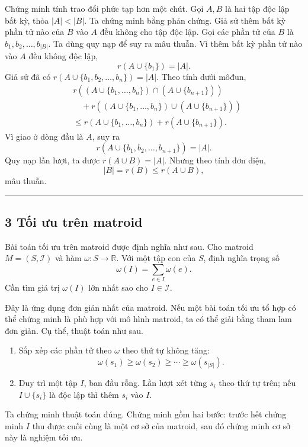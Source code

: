 \documentclass[11pt]{article}
\newcommand{\qedmark}{\hfill\rule{0.7ex}{0.7ex}}
\begin{document}
Chứng minh tính trao đổi phức tạp hơn một chút. Gọi \(A,B\) là hai tập độc lập
bất kỳ, thỏa \(|A|<|B|\). Ta chứng minh bằng phản chứng. Giả sử thêm bất kỳ
phần tử nào của \(B\) vào \(A\) đều không cho tập độc lập. Gọi các phần tử của
\(B\) là \(b_1,b_2,\ldots,b_{|B|}\). Ta dùng quy nạp để suy ra mâu thuẫn. Vì
thêm bất kỳ phần tử nào vào \(A\) đều không độc lập,
\[
  r(A\cup\{b_1\})=|A|.
\]
Giả sử đã có \(r(A\cup\{b_1,b_2,\ldots,b_n\})=|A|\). Theo tính dưới môđun,
\[
\begin{aligned}
&r((A\cup\{b_1,\ldots,b_n\})\cap(A\cup\{b_{n+1}\}))\\
&\quad +r((A\cup\{b_1,\ldots,b_n\})\cup(A\cup\{b_{n+1}\}))\\
&\le r(A\cup\{b_1,\ldots,b_n\})+r(A\cup\{b_{n+1}\}).
\end{aligned}
\]
Vì giao ở dòng đầu là \(A\), suy ra
\[
  r(A\cup\{b_1,b_2,\ldots,b_{n+1}\})=|A|.
\]
Quy nạp lần lượt, ta được \(r(A\cup B)=|A|\). Nhưng theo tính đơn điệu,
\[
  |B|=r(B)\le r(A\cup B),
\]
mâu thuẫn. \qedmark

\subsection*{3 Tối ưu trên matroid}

Bài toán tối ưu trên matroid được định nghĩa như sau. Cho matroid
\(M=(S,\mathcal I)\) và hàm \(\omega:S\to\mathbb R\). Với một tập con của \(S\),
định nghĩa trọng số
\[
  \omega(I)=\sum_{e\in I}\omega(e).
\]
Cần tìm giá trị \(\omega(I)\) lớn nhất sao cho \(I\in\mathcal I\).

Đây là ứng dụng đơn giản nhất của matroid. Nếu một bài toán tối ưu tổ hợp có
thể chứng minh là phù hợp với mô hình matroid, ta có thể giải bằng tham lam đơn
giản. Cụ thể, thuật toán như sau.

\begin{enumerate}
  \item Sắp xếp các phần tử theo \(\omega\) theo thứ tự không tăng:
  \[
    \omega(s_1)\ge \omega(s_2)\ge\cdots\ge\omega(s_{|S|}).
  \]
  \item Duy trì một tập \(I\), ban đầu rỗng. Lần lượt xét từng \(s_i\) theo thứ
  tự trên; nếu \(I\cup\{s_i\}\) là độc lập thì thêm \(s_i\) vào \(I\).
\end{enumerate}

Ta chứng minh thuật toán đúng. Chứng minh gồm hai bước: trước hết chứng minh
\(I\) thu được cuối cùng là một cơ sở của matroid, sau đó chứng minh cơ sở này
là nghiệm tối ưu.
\end{document}

